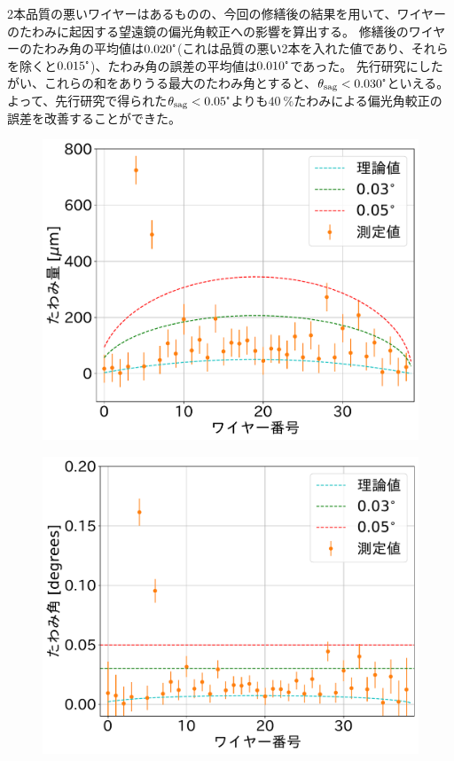 \documentclass[../../main.tex]{subfiles}
\begin{document}
2本品質の悪いワイヤーはあるものの、今回の修繕後の結果を用いて、ワイヤーのたわみに起因する望遠鏡の偏光角較正への影響を算出する。
修繕後のワイヤーのたわみ角の平均値は$0.020\tcdegree$(これは品質の悪い2本を入れた値であり、それらを除くと$0.015\tcdegree$)、たわみ角の誤差の平均値は$0.010\tcdegree$であった。
先行研究にしたがい、これらの和をありうる最大のたわみ角とすると、$\theta_{\mathrm{sag}}<0.030\tcdegree$といえる。
よって、先行研究で得られた$\theta_{\mathrm{sag}}<0.05\tcdegree$よりも$\SI{40}{\%}$たわみによる偏光角較正の誤差を改善することができた。
\begin{figure}[H]
    \begin{minipage}[b]{0.5\hsize}
        \centering
        \includegraphics[width=1.0\textwidth]{wiresag_swg/swg_sag_after.pdf}
        \subcaption{}
        \label{fig:wiresag_swg_sag_result_after}
    \end{minipage}
    \begin{minipage}[b]{0.5\hsize}
        \centering
        \includegraphics[width=1.0\textwidth]{wiresag_swg/swg_sag_angle_after.pdf}

\end{minipage}
\end{figure}
\end{document}
